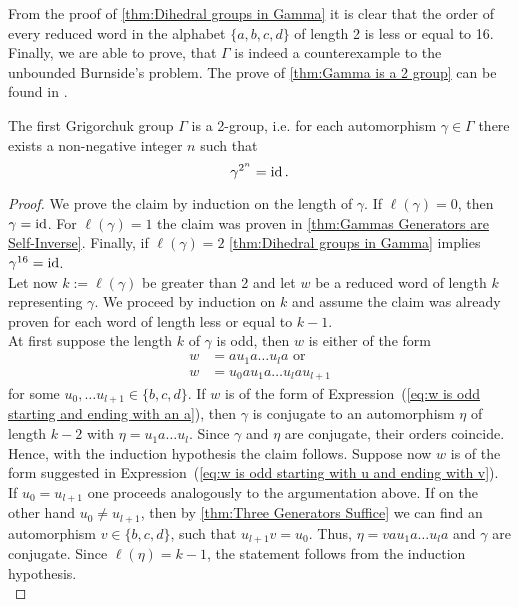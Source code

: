 From the proof of \cref{thm:Dihedral groups in Gamma} it is clear that the order of every reduced word in the alphabet $\lbrace a,b,c,d \rbrace$ of length 2 is less or equal to 16. Finally, we are able to prove, that $\Gamma$ is indeed a counterexample to the unbounded Burnside's problem. The prove of \cref{thm:Gamma is a 2 group} can be found in \cite{de2000topics}.
\begin{thm}\label{thm:Gamma is a 2 group}
The first Grigorchuk group $\Gamma$ is a 2-group, i.e. for each automorphism $\gamma\in\Gamma$ there exists a non-negative integer $n$ such that
\begin{equation*}
\gamma^{2^n}=\operatorname{id}.
\end{equation*}
\end{thm}
\begin{proof}
We prove the claim by induction on the length of $\gamma$. \hypertarget{thm:Base Case}{If} $\ell(\gamma)=0$, then $\gamma=\operatorname{id}$. For $\ell(\gamma)=1$ the claim was proven in \cref{thm:Gammas Generators are Self-Inverse}. Finally, if $\ell(\gamma)=2$ \cref{thm:Dihedral groups in Gamma} implies $\gamma^{16}=\operatorname{id}$.\\
Let now $k:=\ell(\gamma)$ be greater than 2 and let $w$ be a reduced word of length $k$ representing $\gamma$. We proceed by induction on $k$ and assume the claim was already proven for each word of length less or equal to $k-1$.\\
\hypertarget{thm:k is odd}{At first suppose the length $k$ of $\gamma$ is odd}, then $w$ is either of the form
\begin{align}
w&=au_1a\ldots u_la\text{ or}\label{eq:w is odd starting and ending with an a}\\
w&=u_0au_1a\ldots u_lau_{l+1}\label{eq:w is odd starting with u and ending with v}
\end{align}
for some $u_0,\ldots u_{l+1}\in\lbrace b,c,d\rbrace$. If $w$ is of the form of Expression~(\ref{eq:w is odd starting and ending with an a}), then $\gamma$ is conjugate to an automorphism $\eta$ of length $k-2$ with $\eta=u_1a\ldots u_l$. Since $\gamma$ and $\eta$ are conjugate, their orders coincide. Hence, with the induction hypothesis the claim follows. Suppose now $w$ is of the form suggested in Expression~(\ref{eq:w is odd starting with u and ending with v}). If $u_0=u_{l+1}$ one proceeds analogously to the argumentation above. If on the other hand $u_0\not=u_{l+1}$, then by \cref{thm:Three Generators Suffice} we can find an automorphism $v\in\lbrace b,c,d\rbrace$, such that $u_{l+1}v=u_0$. Thus, $\eta=vau_1a\ldots u_la$ and $\gamma$ are conjugate. Since $\ell(\eta)=k-1$, the statement follows from the induction hypothesis.\\

\end{proof}
